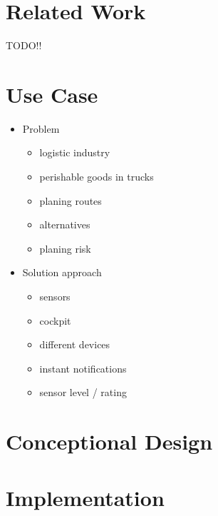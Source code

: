 \documentclass{acm_proc_article-sp}
\begin{document}
\section{Related Work}
\label{sec:Related Work}

TODO!!

\section{Use Case}
\label{sec:Use Case}

\begin{itemize}
	\item Problem
	\begin{itemize}
		\item logistic industry
		\item perishable goods in trucks
		\item planing routes
		\item alternatives
		\item planing risk
	\end{itemize}
	
	\item Solution approach
	\begin{itemize}
		\item sensors
		\item cockpit
		\item different devices
		\item instant notifications
		\item sensor level / rating
	\end{itemize}
	
\end{itemize}

\section{Conceptional Design}
\label{sec:Conceptional Design}

\section{Implementation}
\label{sec:Implementation}
\end{document}

